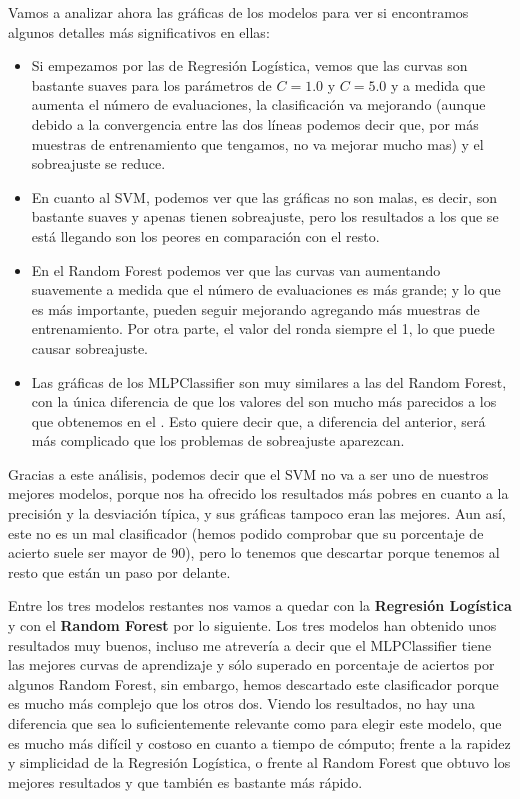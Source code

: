 \documentclass[11pt,a4paper]{article}
\begin{document}
Vamos a analizar ahora las gráficas de los modelos para ver si encontramos algunos detalles más significativos en ellas:

\begin{itemize}[label=\textbullet]
\item Si empezamos por las de Regresión Logística, vemos que las curvas son bastante suaves  para los parámetros de $C = 1.0$ y $C = 5.0$ y a
medida que aumenta el número de evaluaciones, la clasificación va mejorando (aunque debido a la convergencia entre las dos líneas podemos
decir que, por más muestras de entrenamiento que tengamos, no va mejorar mucho mas) y el sobreajuste se reduce.

\item En cuanto al SVM, podemos ver que las gráficas no son malas, es decir, son bastante suaves y apenas tienen sobreajuste, pero los
resultados a
los que se está llegando son los peores en comparación con el resto.

\item En el Random Forest podemos ver que las curvas van aumentando suavemente a medida que el número de evaluaciones es más grande; y lo que es más importante, pueden seguir mejorando agregando más muestras de entrenamiento. Por otra parte, el valor del  ronda siempre el 1, lo que puede causar sobreajuste.

\item Las gráficas de los MLPClassifier son muy similares a las del Random Forest, con la única diferencia de que los valores del
 son mucho más parecidos a los que obtenemos en el . Esto quiere decir que, a diferencia del anterior, será más complicado que los problemas de sobreajuste aparezcan.
\end{itemize}
Gracias a este análisis, podemos decir que el SVM no va a ser uno de nuestros mejores modelos, porque nos ha ofrecido los resultados más
pobres en cuanto a la precisión y la desviación típica, y sus gráficas tampoco eran las mejores. Aun así, este no es un mal clasificador
(hemos podido comprobar que su porcentaje de acierto suele ser mayor de 90), pero lo tenemos que descartar porque tenemos al resto que
están un paso por delante.

Entre los tres modelos restantes nos vamos a quedar con la \textbf{Regresión Logística} y con el \textbf{Random Forest} por lo siguiente.
Los tres modelos han obtenido unos resultados muy buenos, incluso me atrevería a decir que el MLPClassifier tiene las mejores curvas de
aprendizaje y sólo superado en porcentaje de aciertos por algunos Random Forest, sin embargo, hemos descartado este clasificador porque es
mucho más complejo que los otros dos. Viendo los resultados, no hay una diferencia que sea lo suficientemente relevante como para elegir
este modelo, que es mucho más difícil y costoso en cuanto a tiempo de cómputo; frente a la rapidez y simplicidad de la Regresión Logística,
o frente al Random Forest que obtuvo los mejores resultados y que también es bastante más rápido.
\end{document}
